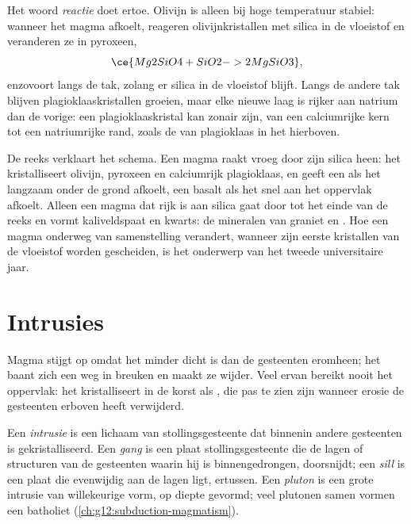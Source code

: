 Het woord \emph{reactie} doet ertoe. Olivijn is alleen bij hoge temperatuur
stabiel: wanneer het magma afkoelt, reageren olivijnkristallen met silica in de vloeistof
en veranderen ze in pyroxeen,
\[
  \ce{Mg2SiO4 + SiO2 -> 2 MgSiO3},
\]
enzovoort langs de tak, zolang er silica in de vloeistof blijft. Langs
de andere tak blijven plagioklaaskristallen groeien, maar elke nieuwe laag is
rijker aan natrium dan de vorige: een plagioklaaskristal kan zonair zijn, van een
calciumrijke kern tot een natriumrijke rand, zoals de  van plagioklaas in
het  hierboven.

De reeks verklaart het schema. Een  magma raakt vroeg door zijn silica heen: het
kristalliseert olivijn, pyroxeen en calciumrijk plagioklaas, en geeft een
 als het langzaam onder de grond afkoelt, een basalt als het snel aan het
oppervlak afkoelt. Alleen een magma dat rijk is aan silica gaat door tot het einde van de reeks en
vormt kaliveldspaat en kwarts: de mineralen van graniet en .
Hoe een magma onderweg van samenstelling verandert, wanneer zijn eerste kristallen
van de vloeistof worden gescheiden, is het onderwerp van het tweede universitaire jaar.

\section{Intrusies}

Magma stijgt op omdat het minder dicht is dan de gesteenten eromheen; het baant zich
een weg in breuken en maakt ze wijder. Veel ervan bereikt nooit het oppervlak:
het kristalliseert in de korst als , die pas te zien zijn wanneer
erosie de gesteenten erboven heeft verwijderd.

\begin{definition}\label{def:g11:igneous-rocks:intrusion}
Een \emph{intrusie} is een lichaam van stollingsgesteente dat
binnenin andere gesteenten is gekristalliseerd. Een \emph{gang} is een plaat
stollingsgesteente die de lagen of structuren van de gesteenten waarin hij is binnengedrongen,
doorsnijdt; een \emph{sill} is een plaat die evenwijdig aan de
lagen ligt, ertussen. Een \emph{pluton} is een grote intrusie van
willekeurige vorm, op diepte gevormd; veel plutonen samen vormen een
batholiet (\cref{ch:g12:subduction-magmatism}).
\end{definition}

